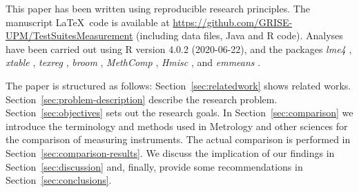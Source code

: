 This paper has been written using reproducible research principles. The manuscript \LaTeX~code  is available at \url{https://github.com/GRISE-UPM/TestSuitesMeasurement} (including data files, Java and R code). Analyses have been carried out using R \cite{R} version 4.0.2 (2020-06-22), and the packages \textit{lme4} \cite{lme4}, \textit{xtable} \cite{xtable}, \textit{texreg} \cite{texreg}, \textit{broom} \cite{broom}, \textit{MethComp} \cite{MethComp}, \textit{Hmisc} \cite{Hmisc}, and \textit{emmeans} \cite{emmeans}.

The paper is structured as follows: Section~\ref{sec:relatedwork} shows related works. Section~\ref{sec:problem-description} describe the research problem. Section~\ref{sec:objectives} sets out the research goals. In Section~\ref{sec:comparison} we introduce the terminology and methods used in Metrology and other sciences for the comparison of measuring instruments. The actual comparison is performed in Section~\ref{sec:comparison-results}. We discuss the implication of our findings in Section~\ref{sec:discussion} and, finally, provide some recommendations in Section~\ref{sec:conclusions}.
